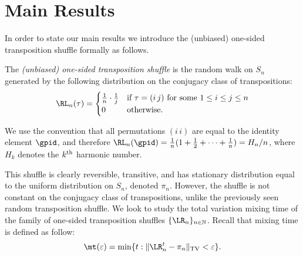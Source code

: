 \documentclass[11pt]{report}
\begin{document}
\section{Main Results}
\label{chpt5:sec:mainresults}











































In order to state our main results we introduce the (unbiased) one-sided transposition shuffle formally as follows.



\begin{defn} 
	\label{LRprob}
	The \emph{(unbiased) one-sided transposition shuffle} is the  
	random walk on 
	$S_n$ generated by the following distribution on the conjugacy 
	class of transpositions:
	\[\RL_{n}(\tau) = 
	\begin{cases}
	\frac{1}{n}\cdot\frac{1}{j} &  \text{if } \tau = (i\,j) \text{ for some 
	} 
	1\leq i 
	\leq j 
	\leq n\\
	0 & \text{otherwise.}
	\end{cases}
	\]
	
	We use the convention that all permutations $(i \,i)$ are equal to 
	the identity element $\gpid$, and therefore 
	$\RL_{n}(\gpid) = \frac{1}{n} (1 + \frac{1}{2} + \dots + 
	\frac{1}{n}) = H_{n}/n$, where $H_{k}$ denotes the 
	$k^{\textnormal{th}}$ 
	harmonic number.	
\end{defn}
This shuffle is clearly  reversible, transitive, and has stationary 
distribution equal to the uniform distribution on $S_{n}$, denoted 
$\pi_{n}$. However, the shuffle is not constant on the conjugacy class of transpositions, unlike the previously seen random transposition shuffle. We look to study the total variation mixing time of the family 
of one-sided transposition shuffles $\{\LR_{n}\}_{n\in\mathbb{N}}$. Recall 
that mixing time is defined as follow:
\[\mt(\varepsilon) = \min\{t : \lVert \LR_{n}^{t} - 
\pi_{n} \rVert_{\textnormal{TV}} < \varepsilon\} .\]
\end{document}
